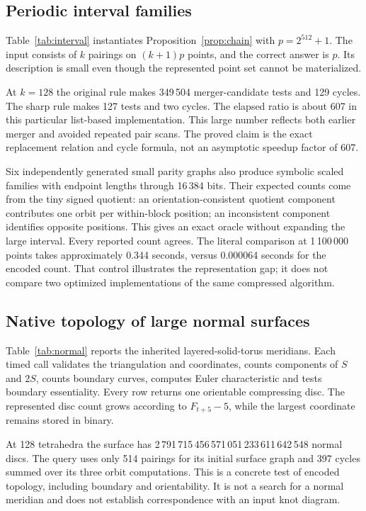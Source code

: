 \subsection{Periodic interval families}

Table~\ref{tab:interval} instantiates Proposition~\ref{prop:chain} with
$p=2^{512}+1$. The input consists of $k$ pairings on $(k+1)p$ points,
and the correct answer is $p$. Its description is small even though the
represented point set cannot be materialized.



At $k=128$ the original rule makes 349\,504 merger-candidate tests and
129 cycles. The sharp rule makes 127 tests and two cycles. The elapsed
ratio is about 607 in this particular list-based implementation. This
large number reflects both earlier merger and avoided repeated pair
scans. The proved claim is the exact replacement relation and cycle
formula, not an asymptotic speedup factor of 607.

Six independently generated small parity graphs also produce symbolic
scaled families with endpoint lengths through 16\,384 bits. Their expected
counts come from the tiny signed quotient: an orientation-consistent
quotient component contributes one orbit per within-block position; an
inconsistent component identifies opposite positions. This gives an
exact oracle without expanding the large interval. Every reported count
agrees. The literal comparison at 1\,100\,000 points takes approximately
0.344 seconds, versus 0.000064 seconds for the encoded count. That control
illustrates the representation gap; it does not compare two optimized
implementations of the same compressed algorithm.

\subsection{Native topology of large normal surfaces}

Table~\ref{tab:normal} reports the inherited layered-solid-torus meridians.
Each timed call validates the triangulation and coordinates, counts
components of $S$ and $2S$, counts boundary curves, computes Euler
characteristic and tests boundary essentiality. Every row returns one
orientable compressing disc. The represented disc count grows according
to $F_{t+5}-5$, while the largest coordinate remains stored in binary.



At 128 tetrahedra the surface has
2\,791\,715\,456\,571\,051\,233\,611\,642\,548 normal discs. The query
uses only 514 pairings for its initial surface graph and 397 cycles
summed over its three orbit computations. This is a concrete test of
encoded topology, including boundary and orientability. It is not a
search for a normal meridian and does not establish correspondence with
an input knot diagram.

